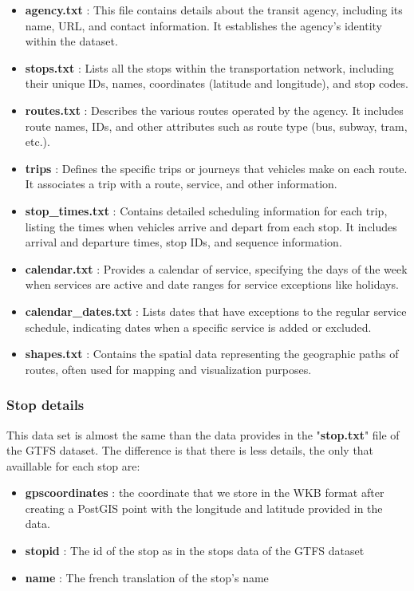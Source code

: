 \documentclass[12pt]{report}
\begin{document}
	\begin{itemize}[noitemsep]
		\item \textbf{agency.txt} : This file contains details about the transit agency, including its name, URL, and contact information. It establishes the agency's identity within the dataset. 
		\item \textbf{stops.txt} : Lists all the stops within the transportation network, including their unique IDs, names, coordinates (latitude and longitude), and stop codes.
		\item \textbf{routes.txt} : Describes the various routes operated by the agency. It includes route names, IDs, and other attributes such as route type (bus, subway, tram, etc.).
		\item \textbf{trips} : Defines the specific trips or journeys that vehicles make on each route. It associates a trip with a route, service, and other information.
		\item \textbf{stop\_times.txt} : Contains detailed scheduling information for each trip, listing the times when vehicles arrive and depart from each stop. It includes arrival and departure times, stop IDs, and sequence information.
		\item \textbf{calendar.txt} : Provides a calendar of service, specifying the days of the week when services are active and date ranges for service exceptions like holidays.
		\item \textbf{calendar\_dates.txt} : Lists dates that have exceptions to the regular service schedule, indicating dates when a specific service is added or excluded.
		\item \textbf{shapes.txt} : Contains the spatial data representing the geographic paths of routes, often used for mapping and visualization purposes.
	\end{itemize}
	
	\subsubsection{Stop details}
	
	This data set is almost the same than the data provides in the "\textbf{stop.txt}" file of the GTFS dataset. The difference is that there is less details, the only that  availlable for each  stop are: 
	
	
	
	
	\begin{itemize}[noitemsep]
		\item \textbf{gpscoordinates} : the coordinate that we store in the WKB format after creating a PostGIS point with the longitude and latitude provided in the data.
		\item \textbf{stopid} : The id of the stop as in the stops data of the GTFS dataset
		\item \textbf{name} : The french translation of the stop's name
	\end{itemize}
	
\end{document}
